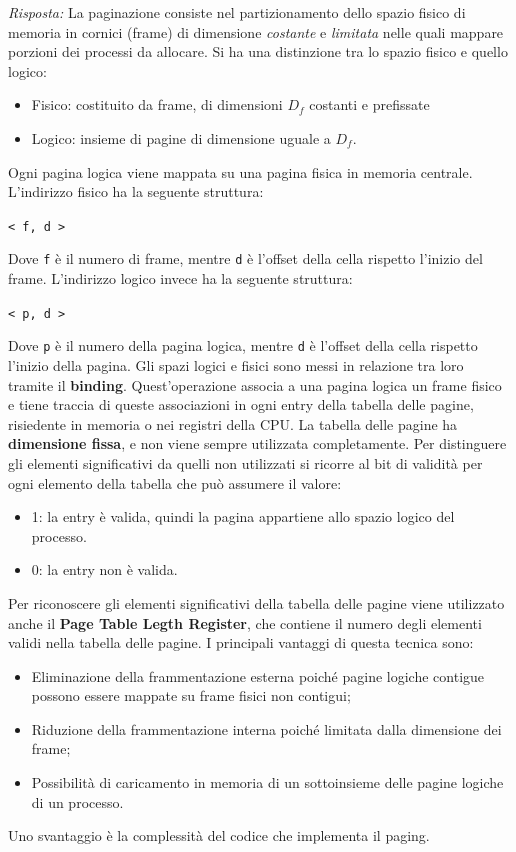 \documentclass{article}
\newenvironment{solution}
    {\textit{Risposta:}}
    {}
\begin{document}
\begin{solution}
La paginazione consiste nel partizionamento dello spazio fisico di memoria in cornici (frame) di dimensione \textit{costante} e \textit{limitata} nelle quali mappare porzioni dei processi da allocare. Si ha una distinzione tra lo spazio fisico e quello logico: 
\begin{itemize}
    \item Fisico: costituito da frame, di dimensioni $D_f$ costanti e prefissate
    \item Logico: insieme di pagine di dimensione uguale a $D_f$. 
\end{itemize}
Ogni pagina logica viene mappata su una pagina fisica in memoria centrale.
\newline
L’indirizzo fisico ha la seguente struttura:
\begin{center}
\texttt{< f, d >}
\end{center}
Dove \texttt{f} è il numero di frame, mentre \texttt{d} è l’offset della cella rispetto l’inizio del frame.
\newline
\newline
L’indirizzo logico invece ha la seguente struttura:
\begin{center}
\texttt{< p, d >}
\end{center}
Dove \texttt{p} è il numero della pagina logica, mentre \texttt{d} è l’offset della cella rispetto l’inizio della pagina.
Gli spazi logici e fisici sono messi in relazione tra loro tramite il \textbf{binding}.
\newline
Quest’operazione associa a una pagina logica un frame fisico e tiene traccia di queste associazioni in ogni entry della tabella delle pagine, risiedente in memoria o nei registri della CPU.
\newline
La tabella delle pagine ha \textbf{dimensione fissa}, e non viene sempre utilizzata completamente.
\newline
Per distinguere gli elementi significativi da quelli non utilizzati si ricorre al bit di validità per ogni elemento della tabella che può assumere il valore:
\begin{itemize}
    \item 1: la entry è valida, quindi la pagina appartiene allo spazio logico del processo.
    \item 0: la entry non è valida.
\end{itemize}
Per riconoscere gli elementi significativi della tabella delle pagine viene utilizzato anche il \textbf{Page Table Legth Register}, che contiene il numero degli elementi validi nella tabella delle pagine.
I principali vantaggi di questa tecnica sono:
\begin{itemize}
    \item Eliminazione della frammentazione esterna poiché pagine logiche contigue possono essere mappate su frame fisici non contigui;
    \item Riduzione della frammentazione interna poiché limitata dalla dimensione dei frame;
    \item Possibilità di caricamento in memoria di un sottoinsieme delle pagine logiche di un processo.
\end{itemize}
Uno svantaggio è la complessità del codice che implementa il paging.
\end{solution}
\end{document}
